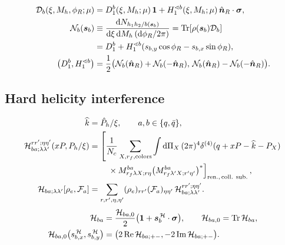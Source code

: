 \documentclass[a4paper,11pt]{article}
\begin{document}
\begin{equation}
    \begin{aligned}
        {\cal D}_b(\xi,M_h,\phi_R;\mu)
        &=D_1^b(\xi,M_h;\mu)\,\mathbf 1
            +H_1^{\sphericalangle b}(\xi,M_h;\mu)\,\hat{\bm n}_R\cdot\bm\sigma,\\
        {\cal N}_b(\bm s_b)
        &\equiv\frac{\dd N_{h_1h_2/b(\bm s_b)}}{\dd\xi\,\dd M_h\,(\dd\phi_R/2\pi)}
         =\operatorname{Tr}\!\left[\rho(\bm s_b){\cal D}_b\right]\\
        &=D_1^b+H_1^{\sphericalangle b}
                         (s_{b,y}\cos\phi_R-s_{b,x}\sin\phi_R),\\
        \bigl(D_1^b,H_1^{\sphericalangle b}\bigr)
        &=\frac{1}{2}\bigl({\cal N}_b(\hat{\bm n}_R)+{\cal N}_b(-\hat{\bm n}_R),\,
                           {\cal N}_b(\hat{\bm n}_R)-{\cal N}_b(-\hat{\bm n}_R)\bigr).
    \end{aligned}
    \label{eq:sidis-spin-diff}
\end{equation}

\subsection{Hard helicity interference}

\begin{equation}
    \begin{aligned}
        \widehat k&=\hat P_h/\xi,\qquad a,b\in\{q,\bar q\},\\
        {\cal H}_{ba;\lambda\lambda'}^{rr';\eta\eta'}(xP,P_h/\xi)
        &=\left[\frac{1}{N_c}\sum_{X,r_f,\mathrm{colors}}
           \int\dd\Pi_X\,(2\pi)^4\delta^{(4)}(q+xP-\widehat k-P_X)\right.\\[-1pt]
        &\qquad\left.{}\times M^{ba}_{r_f\lambda X;r\eta}
                  \bigl(M^{ba}_{r_f\lambda' X;r'\eta'}\bigr)^*
          \right]_{\mathrm{ren.,\,coll.\ sub.}},\\
        {\cal H}_{ba;\lambda\lambda'}[\rho_e,{\cal F}_a]
        &=\sum_{r,r',\eta,\eta'}(\rho_e)_{rr'}({\cal F}_a)_{\eta\eta'}\,
                          {\cal H}_{ba;\lambda\lambda'}^{rr';\eta\eta'} .
    \end{aligned}
    \label{eq:sidis-hard-helicity-matrix}
\end{equation}
\begin{equation}
    \begin{aligned}
        {\cal H}_{ba}&=\frac{{\cal H}_{ba,0}}{2}
                        \bigl(\mathbf 1+\bm s_b^{\,{\cal H}}\cdot\bm\sigma\bigr),
        \qquad {\cal H}_{ba,0}=\operatorname{Tr}{\cal H}_{ba},\\
        {\cal H}_{ba,0}\bigl(s_{b,x}^{\,{\cal H}},s_{b,y}^{\,{\cal H}}\bigr)
        &=\bigl(2\operatorname{Re}{\cal H}_{ba;+-},
                -2\operatorname{Im}{\cal H}_{ba;+-}\bigr).
    \end{aligned}
    \label{eq:sidis-hard-transverse-spin}
\end{equation}
\end{document}
